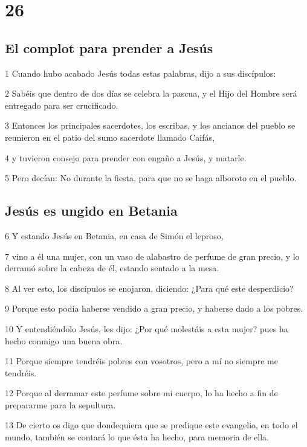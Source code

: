 \chapter{26}

\section*{El complot para prender a Jesús}

\par 1 Cuando hubo acabado Jesús todas estas palabras, dijo a sus discípulos:
\par 2 Sabéis que dentro de dos días se celebra la pascua, y el Hijo del Hombre será entregado para ser crucificado.
\par 3 Entonces los principales sacerdotes, los escribas, y los ancianos del pueblo se reunieron en el patio del sumo sacerdote llamado Caifás,
\par 4 y tuvieron consejo para prender con engaño a Jesús, y matarle.
\par 5 Pero decían: No durante la fiesta, para que no se haga alboroto en el pueblo.

\section*{Jesús es ungido en Betania}

\par 6 Y estando Jesús en Betania, en casa de Simón el leproso,
\par 7 vino a él una mujer, con un vaso de alabastro de perfume de gran precio, y lo derramó sobre la cabeza de él, estando sentado a la mesa.
\par 8 Al ver esto, los discípulos se enojaron, diciendo: ¿Para qué este desperdicio?
\par 9 Porque esto podía haberse vendido a gran precio, y haberse dado a los pobres.
\par 10 Y entendiéndolo Jesús, les dijo: ¿Por qué molestáis a esta mujer? pues ha hecho conmigo una buena obra.
\par 11 Porque siempre tendréis pobres con vosotros, pero a mí no siempre me tendréis.
\par 12 Porque al derramar este perfume sobre mi cuerpo, lo ha hecho a fin de prepararme para la sepultura.
\par 13 De cierto os digo que dondequiera que se predique este evangelio, en todo el mundo, también se contará lo que ésta ha hecho, para memoria de ella.

